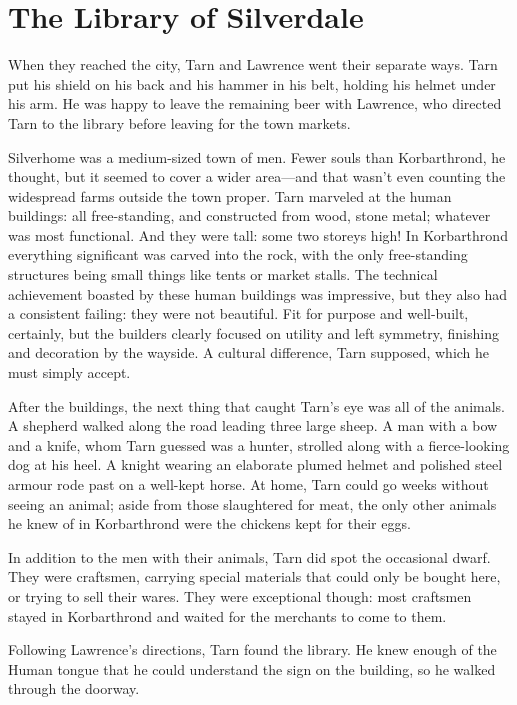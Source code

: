 \chapter{The Library of Silverdale}

When they reached the city, Tarn and Lawrence went their separate ways.  Tarn put his shield on his back and his hammer in his belt, holding his helmet under his arm.  He was happy to leave the remaining beer with Lawrence, who directed Tarn to the library before leaving for the town markets.

Silverhome was a medium-sized town of men.  Fewer souls than Korbarthrond, he thought, but it seemed to cover a wider area---and that wasn't even counting the widespread farms outside the town proper.  Tarn marveled at the human buildings: all free-standing, and constructed from wood, stone metal; whatever was most functional.  And they were tall: some two storeys high!  In Korbarthrond everything significant was carved into the rock, with the only free-standing structures being small things like tents or market stalls.  The technical achievement boasted by these human buildings was impressive, but they also had a consistent failing: they were not beautiful.  Fit for purpose and well-built, certainly, but the builders clearly focused on utility and left symmetry, finishing and decoration by the wayside.  A cultural difference, Tarn supposed, which he must simply accept.

After the buildings, the next thing that caught Tarn's eye was all of the animals.  A shepherd walked along the road leading three large sheep. A man with a bow and a knife, whom Tarn guessed was a hunter, strolled along with a fierce-looking dog at his heel.  A knight wearing an elaborate plumed helmet and polished steel armour rode past on a well-kept horse.  At home, Tarn could go weeks without seeing an animal; aside from those slaughtered for meat, the only other animals he knew of in Korbarthrond were the chickens kept for their eggs.

In addition to the men with their animals, Tarn did spot the occasional dwarf.  They were craftsmen, carrying special materials that could only be bought here, or trying to sell their wares.  They were exceptional though: most craftsmen stayed in Korbarthrond and waited for the merchants to come to them.

Following Lawrence's directions, Tarn found the library.  He knew enough of the Human tongue that he could understand the sign on the building, so he walked through the doorway.

